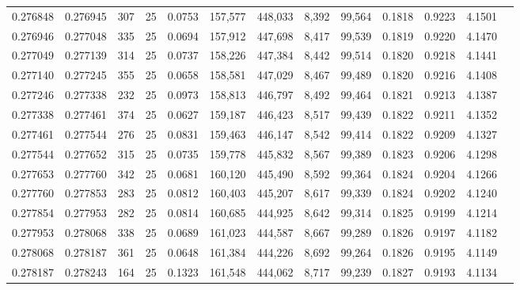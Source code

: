 \begin{tabular}{rrrrrrrrrrrrr}
0.276848 & 0.276945 &   307 &  25 &                                     0.0753 & 157,577 & 448,033 &   8,392 &  99,564 & 0.1818 & 0.9223 & 4.1501 \\
0.276946 & 0.277048 &   335 &  25 &                                     0.0694 & 157,912 & 447,698 &   8,417 &  99,539 & 0.1819 & 0.9220 & 4.1470 \\
0.277049 & 0.277139 &   314 &  25 &                                     0.0737 & 158,226 & 447,384 &   8,442 &  99,514 & 0.1820 & 0.9218 & 4.1441 \\
0.277140 & 0.277245 &   355 &  25 &                                     0.0658 & 158,581 & 447,029 &   8,467 &  99,489 & 0.1820 & 0.9216 & 4.1408 \\
0.277246 & 0.277338 &   232 &  25 &                                     0.0973 & 158,813 & 446,797 &   8,492 &  99,464 & 0.1821 & 0.9213 & 4.1387 \\
0.277338 & 0.277461 &   374 &  25 &                                     0.0627 & 159,187 & 446,423 &   8,517 &  99,439 & 0.1822 & 0.9211 & 4.1352 \\
0.277461 & 0.277544 &   276 &  25 &                                     0.0831 & 159,463 & 446,147 &   8,542 &  99,414 & 0.1822 & 0.9209 & 4.1327 \\
0.277544 & 0.277652 &   315 &  25 &                                     0.0735 & 159,778 & 445,832 &   8,567 &  99,389 & 0.1823 & 0.9206 & 4.1298 \\
0.277653 & 0.277760 &   342 &  25 &                                     0.0681 & 160,120 & 445,490 &   8,592 &  99,364 & 0.1824 & 0.9204 & 4.1266 \\
0.277760 & 0.277853 &   283 &  25 &                                     0.0812 & 160,403 & 445,207 &   8,617 &  99,339 & 0.1824 & 0.9202 & 4.1240 \\
0.277854 & 0.277953 &   282 &  25 &                                     0.0814 & 160,685 & 444,925 &   8,642 &  99,314 & 0.1825 & 0.9199 & 4.1214 \\
0.277953 & 0.278068 &   338 &  25 &                                     0.0689 & 161,023 & 444,587 &   8,667 &  99,289 & 0.1826 & 0.9197 & 4.1182 \\
0.278068 & 0.278187 &   361 &  25 &                                     0.0648 & 161,384 & 444,226 &   8,692 &  99,264 & 0.1826 & 0.9195 & 4.1149 \\
0.278187 & 0.278243 &   164 &  25 &                                     0.1323 & 161,548 & 444,062 &   8,717 &  99,239 & 0.1827 & 0.9193 & 4.1134 \\

\end{tabular}
